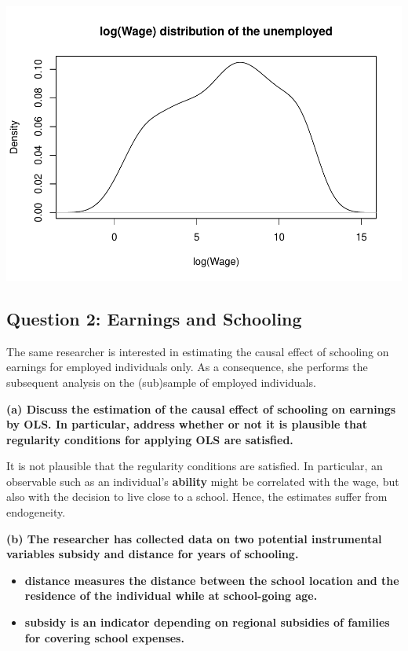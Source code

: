 \documentclass[
]{article}
\providecommand{\tightlist}{%
  \setlength{\itemsep}{0pt}\setlength{\parskip}{0pt}}
\begin{document}
\includegraphics{assignment_1_files/figure-latex/predict_unemployed_log_Wage-1.pdf}

\clearpage

\hypertarget{question-2-earnings-and-schooling}{%
\subsection{Question 2: Earnings and
Schooling}\label{question-2-earnings-and-schooling}}

The same researcher is interested in estimating the causal effect of
schooling on earnings for employed individuals only. As a consequence,
she performs the subsequent analysis on the (sub)sample of employed
individuals.

\textbf{(a) Discuss the estimation of the causal effect of schooling on
earnings by OLS. In particular, address whether or not it is plausible
that regularity conditions for applying OLS are satisfied.}

It is not plausible that the regularity conditions are satisfied. In
particular, an observable such as an individual's \textbf{ability} might
be correlated with the wage, but also with the decision to live close to
a school. Hence, the estimates suffer from endogeneity.

\textbf{(b) The researcher has collected data on two potential
instrumental variables subsidy and distance for years of schooling.}

\begin{itemize}
\tightlist
\item
  \textbf{distance measures the distance between the school location and
  the residence of the individual while at school-going age.}
\item
  \textbf{subsidy is an indicator depending on regional subsidies of
  families for covering school expenses.}
\end{itemize}
\end{document}
